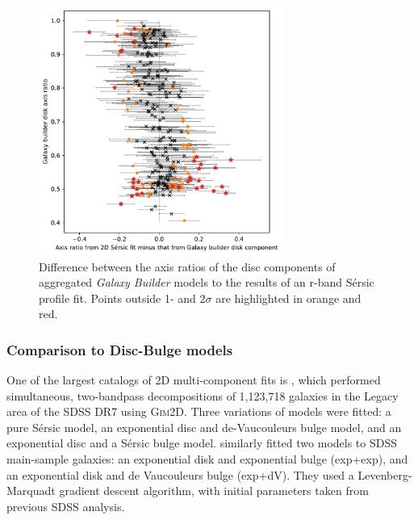 \documentclass[../main.tex]{subfiles}
\begin{document}
\begin{figure}
  \includegraphics[width=8cm]{images__results/gzb-agg-nsa-comparison.pdf}
  \caption{Difference between the axis ratios of the disc components of aggregated \textit{Galaxy Builder} models to the results of an r-band S\'ersic profile fit. Points outside 1- and $2\sigma$ are highlighted in orange and red.}
  \label{fig:ax_ratio_comparison}
\end{figure}


\subsubsection{Comparison to Disc-Bulge models}

One of the largest catalogs of 2D multi-component fits is \citet{2011ApJS..196...11S}, which performed simultaneous, two-bandpass decompositions of 1,123,718 galaxies in the Legacy area of the SDSS DR7 using \textsc{Gim2D}. Three variations of models were fitted: a pure S\'ersic model, an exponential disc and de-Vaucouleurs bulge model, and an exponential disc and a S\'ersic bulge model. \citet{2012MNRAS.421.2277L} similarly fitted two models to SDSS main-sample galaxies: an exponential disk and exponential bulge (exp+exp), and an exponential disk and de Vaucouleurs bulge (exp+dV). They used a Levenberg-Marquadt gradient descent algorithm, with initial parameters taken from previous SDSS analysis.
\end{document}
